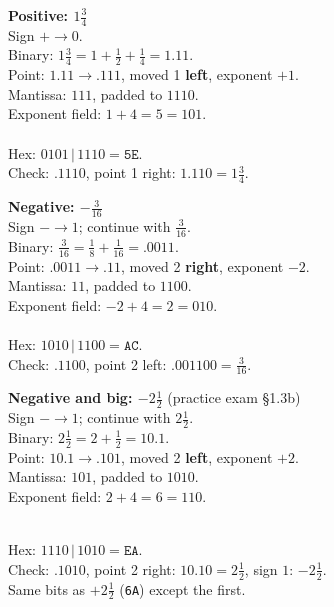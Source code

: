 \documentclass{fkt-notes}
\newcommand{\hx}[1]{\texttt{#1}}
\begin{document}
\noindent
\begin{minipage}[t]{0.48\linewidth}
  \textbf{Positive: $1\frac34$}\\[2pt]
  Sign $+\to0$.\\
  Binary: $1\frac34=1+\frac12+\frac14=1.11$.\\
  Point: $1.11\to.111$, moved 1 \textbf{left}, exponent $+1$.\\
  Mantissa: $111$, padded to $1110$.\\
  Exponent field: $1+4=5=101$.\\
  \\[2pt]
  Hex: $0101\,|\,1110=\mathbf{\hx{5E}}$.\\
  Check: $.1110$, point 1 right: $1.110=1\frac34$. \checkmark
\end{minipage}\hfill
\begin{minipage}[t]{0.48\linewidth}
  \textbf{Negative: $-\frac3{16}$}\\[2pt]
  Sign $-\to1$; continue with $\frac3{16}$.\\
  Binary: $\frac3{16}=\frac18+\frac1{16}=.0011$.\\
  Point: $.0011\to.11$, moved 2 \textbf{right}, exponent $-2$.\\
  Mantissa: $11$, padded to $1100$.\\
  Exponent field: $-2+4=2=010$.\\
  \\[2pt]
  Hex: $1010\,|\,1100=\mathbf{\hx{AC}}$.\\
  Check: $.1100$, point 2 left: $.001100=\frac3{16}$. \checkmark
\end{minipage}

\medskip\noindent
\begin{minipage}[t]{0.48\linewidth}
  \textbf{Negative and big: $-2\frac12$} (practice exam \S1.3b)\\[2pt]
  Sign $-\to1$; continue with $2\frac12$.\\
  Binary: $2\frac12=2+\frac12=10.1$.\\
  Point: $10.1\to.101$, moved 2 \textbf{left}, exponent $+2$.\\
  Mantissa: $101$, padded to $1010$.\\
  Exponent field: $2+4=6=110$.
\end{minipage}\hfill
\begin{minipage}[t]{0.48\linewidth}
  \vspace{1.2\baselineskip}
  \\[2pt]
  Hex: $1110\,|\,1010=\mathbf{\hx{EA}}$.\\
  Check: $.1010$, point 2 right: $10.10=2\frac12$, sign $1$: $-2\frac12$. \checkmark\\
  Same bits as $+2\frac12$ (\hx{6A}) except the first.
\end{minipage}
\end{document}
